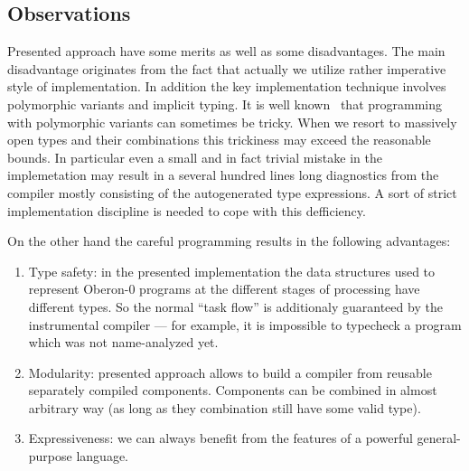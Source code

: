 \subsection{Observations}

Presented approach have some merits as well as some disadvantages. The main disadvantage originates from
the fact that actually we utilize rather imperative style of implementation. In addition the key implementation
technique involves polymorphic variants and implicit typing. It is well known~\cite{PVReuse} that 
programming with polymorphic variants can sometimes be tricky. When we resort to massively open types and
their combinations this trickiness may exceed the reasonable bounds. In particular even a small
and in fact trivial mistake in the implemetation may result in a several hundred lines long diagnostics
from the compiler mostly consisting of the autogenerated type expressions. A sort of strict implementation
discipline is needed to cope with this defficiency.

On the other hand the careful programming results in the following advantages:

\begin{enumerate}
\item Type safety: in the presented implementation the data structures used to represent Oberon-0
programs at the different stages of processing have different types. So the normal ``task flow'' is
additionaly guaranteed by the instrumental compiler --- for example, it is impossible to typecheck a program
which was not name-analyzed yet. 
\item Modularity: presented approach allows to build a compiler from reusable separately compiled components. 
Components can be combined in almost arbitrary way (as long as they combination still have some valid type).
\item Expressiveness: we can always benefit from the features of a powerful general-purpose language.
\end{enumerate}
